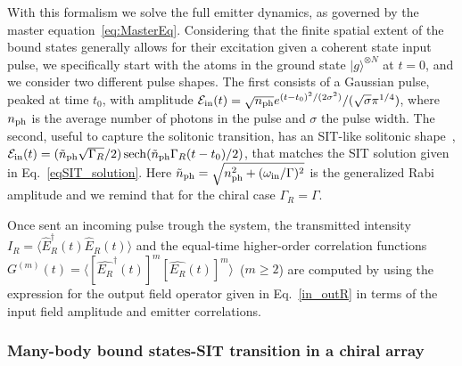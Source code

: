 \documentclass[pra,twocolumn,showpacs,preprintnumbers,amsmath,amssymb]{revtex4-1}
\begin{document}
With this formalism we solve the full emitter dynamics, as governed by the master equation~\eqref{eq:MasterEq}. 
Considering that the finite spatial extent of the bound states generally allows for their excitation given a coherent state input pulse,
we specifically start with the atoms in the ground state $|g\rangle^{\otimes N}$ at $t=0$, and we consider two different  pulse shapes. The first consists of a Gaussian pulse, peaked at time $t_0$, with amplitude $\mathcal{E}_{\rm in}(t)=\sqrt{n_{\rm ph}}e^{(t- t_0)^2/(2 \sigma^2)}/(\sqrt{\sigma}\pi^{1/4})$, where $n_{\rm ph}$ is the average number of photons in the pulse and $\sigma$ the pulse width.  
The second, useful  to capture the solitonic transition, has an SIT-like solitonic shape~\cite{McCall1,McCall2,Bullough,mahmo_calajo},  $\mathcal{E}_{\rm in}(t)=(\tilde n_{\rm ph}\sqrt{\Gamma_R}/2)\operatorname{sech}(\tilde n_{\rm ph}\Gamma_R (t-t_0)/2)$,  that matches the 
SIT solution given in Eq.~\eqref{eqSIT_solution}. Here  $\tilde n_{\rm ph}=\sqrt{n_{\rm ph}^2+(\omega_{\rm in}/\Gamma)^2}$ is the generalized Rabi amplitude and we remind that for the chiral case $\Gamma_R=\Gamma$.

Once sent an incoming pulse trough the system, the transmitted intensity $I_R=\langle \hat E_R^{\dagger}(t) \hat E_R(t)\rangle$ and the equal-time higher-order correlation functions $G^{(m)}(t)=\langle \left[ \hat{E_R}^\dagger(t)\right]^m\left[\hat{E_R}(t)\right]^m \rangle$~($m\geq 2$) are
 computed by using the expression for the output field operator given in Eq.~\eqref{in_outR} in terms of the input field amplitude and emitter correlations.
 


\subsubsection{Many-body bound states-SIT transition in a chiral array}
\end{document}
